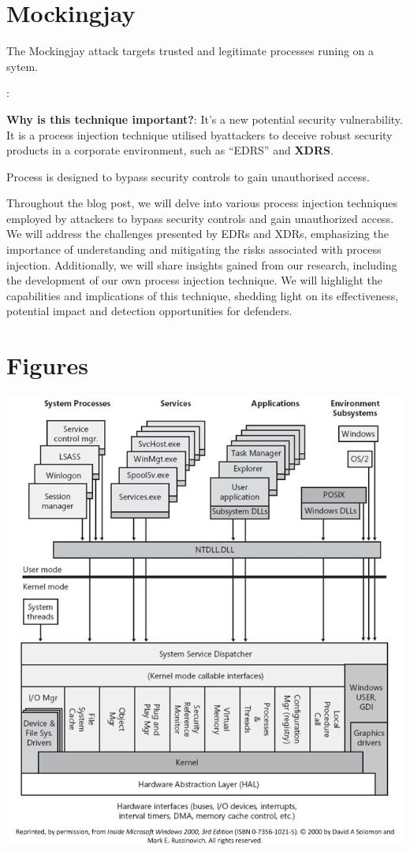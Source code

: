 \documentclass{article}
\begin{document}
\section{Mockingjay}

The Mockingjay  attack targets trusted and legitimate processes runing on a sytem.  

\textbf{}: \textcite{Peixoto:2023}

\textbf{Why is this technique important?}: It's a new potential security vulnerability. It is a process injection
technique utilised byattackers to deceive robust security products in a corporate environment, such as ``EDRS'' and \textbf{XDRS}.

Process is designed to bypass security controls to gain unauthorised access.

Throughout the blog post, we will delve into various process injection techniques employed by attackers to bypass security controls and gain unauthorized access. We will address the challenges presented by EDRs and XDRs, emphasizing the importance of understanding and mitigating the risks associated with process injection. Additionally, we will share insights gained from our research, including the development of our own process injection technique. We will highlight the capabilities and implications of this technique, shedding light on its effectiveness, potential impact and detection opportunities for defenders.


\section{Figures}

\includegraphics[scale=0.4]{ms_hardware_interfaces.png}

\printbibliography
\end{document}
